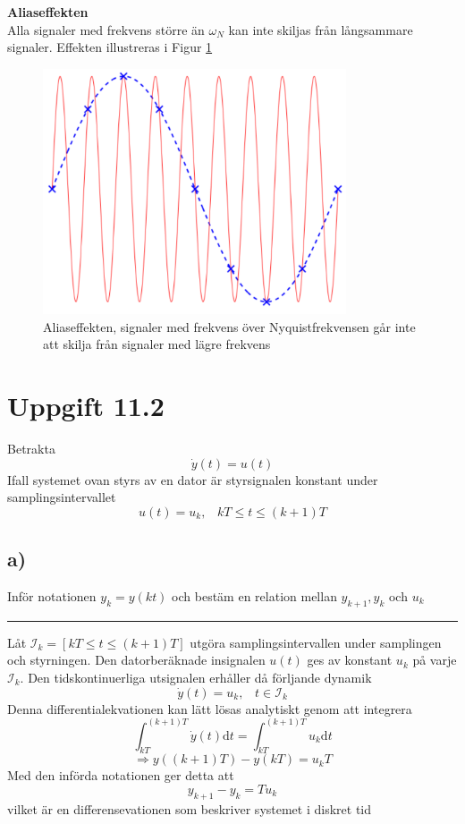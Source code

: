 \documentclass[12pt]{article}
\newcommand{\qline}{\hrule \vspace*{10pt}}
\newcommand{\de}[1]{\mathrm{d} #1}
\begin{document}
\textbf{Aliaseffekten} \\
Alla signaler med frekvens större än $\omega_N$ kan inte skiljas från långsammare signaler. Effekten illustreras i Figur \ref{fig:alias}

\begin{figure}[h!]
  \centering
  \includegraphics[width=0.8\textwidth]{alias}
  \caption{Aliaseffekten, signaler med frekvens över Nyquistfrekvensen går inte att skilja från signaler med lägre frekvens}
  \label{fig:alias}
\end{figure}
\FloatBarrier

\section*{Uppgift 11.2}
Betrakta 
\[\dot{y}(t) = u(t)\]
Ifall systemet ovan styrs av en dator är styrsignalen konstant under samplingsintervallet 
\[u(t) = u_k, \;\;\; kT \leq t \leq (k+1)T\]

\subsection*{a)}
Inför notationen $y_k = y(kt)$ och bestäm en relation mellan $y_{k+1},y_k$ och $u_k$
\qline
Låt $\mathcal{I}_k = [kT \leq t \leq (k+1)T]$ utgöra samplingsintervallen under samplingen och styrningen. Den datorberäknade insignalen $u(t)$ ges av konstant $u_k$ på varje $\mathcal{I}_k$. Den tidskontinuerliga utsignalen erhåller då förljande dynamik 
\[\dot{y}(t) = u_k, \;\;\; t \in \mathcal{I}_k\]
Denna differentialekvationen kan lätt lösas analytiskt genom att integrera 
\[\int_{kT}^{(k+1)T} \dot{y}(t) \de{t} = \int_{kT}^{(k+1)T}u_k \de{t}\] 
\[\Rightarrow y((k+1)T)-y(kT) = u_k T\]
Med den införda notationen ger detta att 
\[y_{k+1} - y_k = Tu_k\]
vilket är en differensevationen som beskriver systemet i diskret tid
\end{document}
